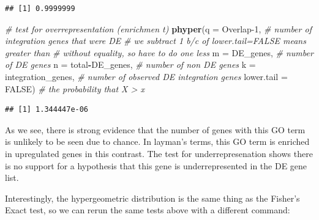 \documentclass[
]{book}
\newenvironment{Shaded}{\begin{snugshade}}{\end{snugshade}}
\newcommand{\AttributeTok}[1]{\textcolor[rgb]{0.13,0.29,0.53}{#1}}
\newcommand{\CommentTok}[1]{\textcolor[rgb]{0.56,0.35,0.01}{\textit{#1}}}
\newcommand{\ConstantTok}[1]{\textcolor[rgb]{0.56,0.35,0.01}{#1}}
\newcommand{\DecValTok}[1]{\textcolor[rgb]{0.00,0.00,0.81}{#1}}
\newcommand{\FunctionTok}[1]{\textcolor[rgb]{0.13,0.29,0.53}{\textbf{#1}}}
\newcommand{\NormalTok}[1]{#1}
\newcommand{\SpecialCharTok}[1]{\textcolor[rgb]{0.81,0.36,0.00}{\textbf{#1}}}
\newcommand{\StringTok}[1]{\textcolor[rgb]{0.31,0.60,0.02}{#1}}
\begin{document}
\begin{verbatim}
## [1] 0.9999999
\end{verbatim}

\begin{Shaded}
\begin{Highlighting}[]
\CommentTok{\# test for overrepresentation (enrichmen t)}
\FunctionTok{phyper}\NormalTok{(}\AttributeTok{q =}\NormalTok{ Overlap}\DecValTok{{-}1}\NormalTok{, }\CommentTok{\# number of integration genes that were DE}
                      \CommentTok{\# we subtract 1 b/c of lower.tail=FALSE means greater than}
                      \CommentTok{\# without equality, so have to do one less}
       \AttributeTok{m =}\NormalTok{ DE\_genes, }\CommentTok{\# number of DE genes}
       \AttributeTok{n =}\NormalTok{ total}\SpecialCharTok{{-}}\NormalTok{DE\_genes, }\CommentTok{\# number of non DE genes}
       \AttributeTok{k =}\NormalTok{ integration\_genes, }\CommentTok{\# number of observed DE integration genes}
       \AttributeTok{lower.tail =} \ConstantTok{FALSE}\NormalTok{) }\CommentTok{\# the probability that X \textgreater{} x}
\end{Highlighting}
\end{Shaded}

\begin{verbatim}
## [1] 1.344447e-06
\end{verbatim}

As we see, there is strong evidence that the number of genes with this GO term is unlikely to be seen due to chance. In layman's terms, this GO term is enriched in upregulated genes in this contrast. The test for underrepresenation shows there is no support for a hypothesis that this gene is underrepresented in the DE gene list.

Interestingly, the hypergeometric distribution is the same thing as the Fisher's Exact test, so we can rerun the same tests above with a different command:

\begin{Shaded}
\end{Shaded}
\end{document}
